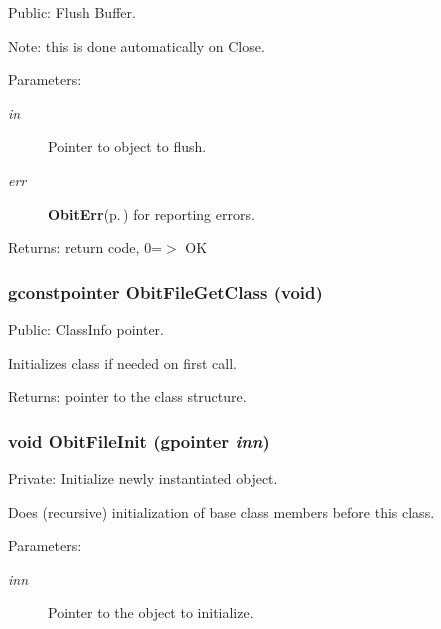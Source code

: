Public: Flush Buffer. 

Note: this is done automatically on Close. \begin{Desc}
\item[Parameters:]
\begin{description}
\item[{\em in}]Pointer to object to flush. \item[{\em err}]{\bf Obit\-Err}{\rm (p.\,\pageref{structObitErr})} for reporting errors. \end{description}
\end{Desc}
\begin{Desc}
\item[Returns:]return code, 0=$>$ OK \end{Desc}
\subsubsection{\setlength{\rightskip}{0pt plus 5cm}gconstpointer Obit\-File\-Get\-Class (void)}\label{ObitFile_8c_a7}


Public: Class\-Info pointer. 

Initializes class if needed on first call. \begin{Desc}
\item[Returns:]pointer to the class structure. \end{Desc}
\subsubsection{\setlength{\rightskip}{0pt plus 5cm}void Obit\-File\-Init (gpointer {\em inn})}\label{ObitFile_8c_a3}


Private: Initialize newly instantiated object. 

Does (recursive) initialization of base class members before this class. \begin{Desc}
\item[Parameters:]
\begin{description}
\item[{\em inn}]Pointer to the object to initialize. \end{description}
\end{Desc}
